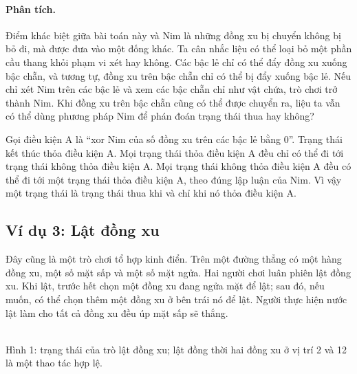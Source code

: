 \documentclass[11pt]{article}
\begin{document}
\paragraph{Phân tích.}
Điểm khác biệt giữa bài toán này và Nim là những đồng xu bị chuyển không bị bỏ
đi, mà được đưa vào một đống khác. Ta cân nhắc liệu có thể loại bỏ một phần cầu
thang khỏi phạm vi xét hay không. Các bậc lẻ chỉ có thể đẩy đồng xu xuống bậc
chẵn, và tương tự, đồng xu trên bậc chẵn chỉ có thể bị đẩy xuống bậc lẻ. Nếu
chỉ xét Nim trên các bậc lẻ và xem các bậc chẵn chỉ như vật chứa, trò chơi trở
thành Nim. Khi đồng xu trên bậc chẵn cũng có thể được chuyển ra, liệu ta vẫn
có thể dùng phương pháp Nim để phán đoán trạng thái thua hay không?

Gọi điều kiện A là ``xor Nim của số đồng xu trên các bậc lẻ bằng 0''. Trạng thái
kết thúc thỏa điều kiện A. Mọi trạng thái thỏa điều kiện A đều chỉ có thể đi
tới trạng thái không thỏa điều kiện A. Mọi trạng thái không thỏa điều kiện A
đều có thể đi tới một trạng thái thỏa điều kiện A, theo đúng lập luận của Nim.
Vì vậy một trạng thái là trạng thái thua khi và chỉ khi nó thỏa điều kiện A.

\subsection*{Ví dụ 3: Lật đồng xu}

Đây cũng là một trò chơi tổ hợp kinh điển. Trên một đường thẳng có một hàng
đồng xu, một số mặt sấp và một số mặt ngửa. Hai người chơi luân phiên lật đồng
xu. Khi lật, trước hết chọn một đồng xu đang ngửa mặt để lật;
sau đó, nếu muốn, có thể chọn thêm một đồng xu ở bên trái nó để lật. Người
thực hiện nước lật làm cho tất cả đồng xu đều úp mặt sấp sẽ thắng.

\begin{center}
\\[-0.2em]
{\small Hình 1: trạng thái của trò lật đồng xu; lật đồng thời hai đồng xu ở
vị trí 2 và 12 là một thao tác hợp lệ.}
\end{center}
\end{document}
